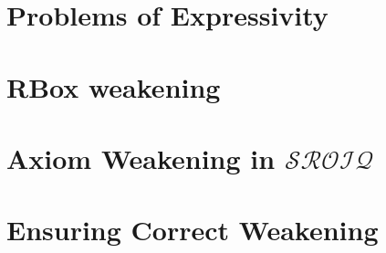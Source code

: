 \section{Problems of Expressivity} \label{expressivity-problems}



\section{RBox weakening} \label{rbox-weakening}



\section{Axiom Weakening in \texorpdfstring{$\mathcal{SROIQ}$}{SROIQ}} \label{weakening-sroiq}



\section{Ensuring Correct Weakening} \label{ensure-correct}


